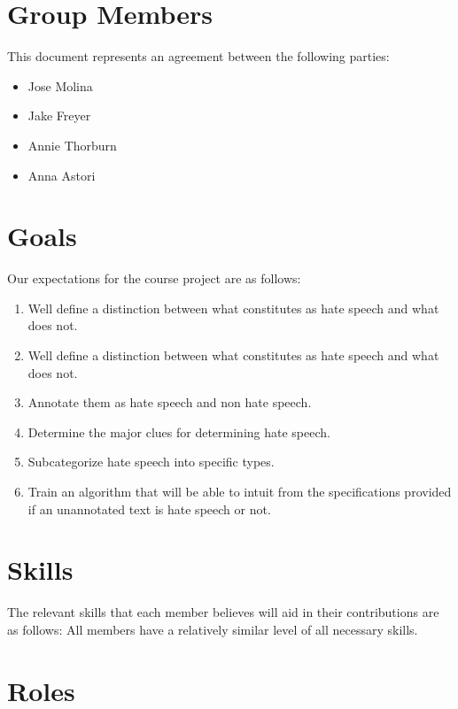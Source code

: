 \documentclass{article}
\newcommand{\groupmember}[1]{#1}
\begin{document}
\section{Group Members} %
\label{par:group_members}
This document represents an agreement between the following parties:
\begin{itemize}
    \item \groupmember{Jose Molina}
    \item \groupmember{Jake Freyer}
    \item \groupmember{Annie Thorburn}
    \item \groupmember{Anna Astori}
\end{itemize}

\section{Goals} %
\label{par:expectations}
Our expectations for the course project are as follows:
\begin{enumerate}
    \item Well define a distinction between what constitutes as hate speech and what does not.
    \item Well define a distinction between what constitutes as hate speech and what does not.
    \item Annotate them as hate speech and non hate speech.
    \item Determine the major clues for determining hate speech.
    \item Subcategorize hate speech into specific types.
    \item Train an algorithm that will be able to intuit from the specifications provided if an unannotated text is hate speech or not.

\end{enumerate}

\section{Skills} %
\label{sec:skills}

The relevant skills that each member believes will aid in their contributions are as follows:
All members have a relatively similar level of all necessary skills.


\section{Roles} %
\label{sec:roles}
\end{document}
